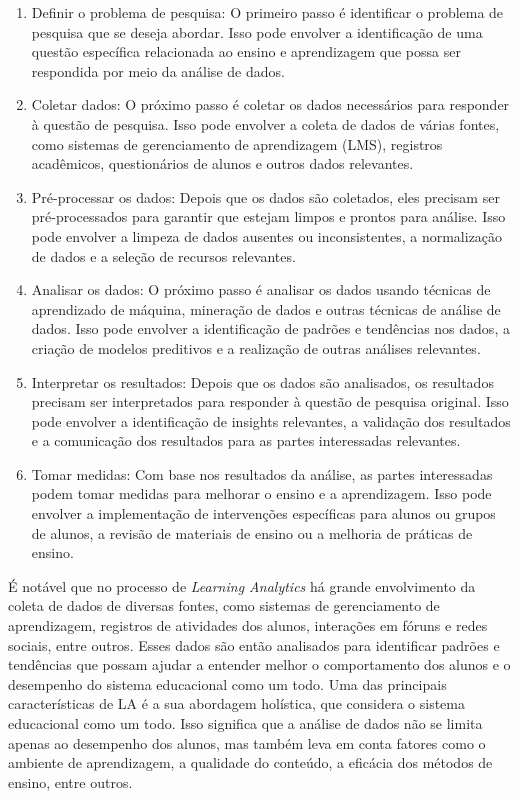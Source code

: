 \begin{enumerate}
    \item {Definir o problema de pesquisa: O primeiro passo é identificar o problema de pesquisa que se deseja abordar. Isso pode envolver a identificação de uma questão específica relacionada ao ensino e aprendizagem que possa ser respondida por meio da análise de dados.}
    \item {Coletar dados: O próximo passo é coletar os dados necessários para responder à questão de pesquisa. Isso pode envolver a coleta de dados de várias fontes, como sistemas de gerenciamento de aprendizagem (LMS), registros acadêmicos, questionários de alunos e outros dados relevantes.}
    \item {Pré-processar os dados: Depois que os dados são coletados, eles precisam ser pré-processados para garantir que estejam limpos e prontos para análise. Isso pode envolver a limpeza de dados ausentes ou inconsistentes, a normalização de dados e a seleção de recursos relevantes.}
    \item {Analisar os dados: O próximo passo é analisar os dados usando técnicas de aprendizado de máquina, mineração de dados e outras técnicas de análise de dados. Isso pode envolver a identificação de padrões e tendências nos dados, a criação de modelos preditivos e a realização de outras análises relevantes.}
    \item {Interpretar os resultados: Depois que os dados são analisados, os resultados precisam ser interpretados para responder à questão de pesquisa original. Isso pode envolver a identificação de insights relevantes, a validação dos resultados e a comunicação dos resultados para as partes interessadas relevantes.}
    \item {Tomar medidas: Com base nos resultados da análise, as partes interessadas podem tomar medidas para melhorar o ensino e a aprendizagem. Isso pode envolver a implementação de intervenções específicas para alunos ou grupos de alunos, a revisão de materiais de ensino ou a melhoria de práticas de ensino.}
    
\end{enumerate}

{É notável que no processo de \textit{Learning Analytics} há grande envolvimento da coleta de dados de diversas fontes, como sistemas de gerenciamento de aprendizagem, registros de atividades dos alunos, interações em fóruns e redes sociais, entre outros. Esses dados são então analisados para identificar padrões e tendências que possam ajudar a entender melhor o comportamento dos alunos e o desempenho do sistema educacional como um todo. Uma das principais características de LA é a sua abordagem holística, que considera o sistema educacional como um todo. Isso significa que a análise de dados não se limita apenas ao desempenho dos alunos, mas também leva em conta fatores como o ambiente de aprendizagem, a qualidade do conteúdo, a eficácia dos métodos de ensino, entre outros.}

